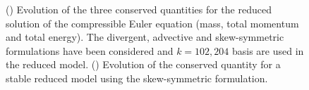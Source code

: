 \begin{figure}
\begin{subfigure}[]{0.48\linewidth}
  \caption{}
  \label{conservation_1D_focus}
  \end{subfigure}
  \caption{(\protect{})  Evolution of the three conserved quantities for the reduced solution of the compressible Euler equation (mass, total momentum and total energy).  The divergent, advective and skew-symmetric formulations have been considered and $k=102,204$ basis are used in the reduced model. (\protect{}) Evolution of the conserved quantity for a stable reduced model using the skew-symmetric formulation.} 
  \label{fig:energy_pres_1D}
\end{figure}

